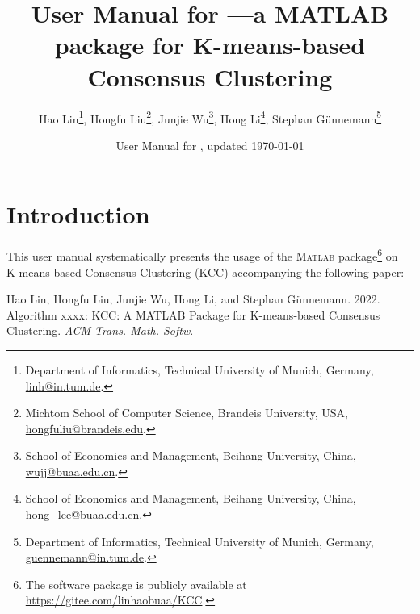 \documentclass[10pt]{acmtrans2e}
\title{User Manual for \package{KCC}---a {MATLAB} package for K-means-based Consensus Clustering}
\author{
Hao Lin\footnote{Department of Informatics, Technical University of Munich, Germany,
\textsf{\href{mailto:linh@in.tum.de}{linh@in.tum.de}}.}, \quad
Hongfu Liu\footnote{Michtom School of Computer Science, Brandeis University, USA, \textsf{\href{mailto:hongfuliu@brandeis.edu}{hongfuliu@brandeis.edu}}.}, \quad
Junjie Wu\footnote{School of Economics and Management, Beihang University, China, \textsf{\href{mailto:wujj@buaa.edu.cn}{wujj@buaa.edu.cn}}.}, \quad
Hong Li\footnote{School of Economics and Management, Beihang University, China, \textsf{\href{mailto:hong_lee@buaa.edu.cn}{hong\_lee@buaa.edu.cn}}.}, \quad
Stephan Günnemann\footnote{Department of Informatics, Technical University of Munich, Germany, \textsf{\href{mailto:guennemann@in.tum.de}{guennemann@in.tum.de}}.}
}
\date{User Manual for \package{KCC}, updated \today}
\newcommand{\Matlab}{\textsc{Matlab}}
\begin{document}
\maketitle

\vspace*{-0.5cm}

\section{Introduction}

This user manual systematically presents the usage of the \Matlab{} package\footnote{The software package is publicly available at \url{https://gitee.com/linhaobuaa/KCC}.} on K-means-based Consensus Clustering (KCC) accompanying the following paper:
\begin{center}
\begin{minipage}{0.90\textwidth}
Hao Lin, Hongfu Liu, Junjie Wu, Hong Li, and Stephan Günnemann. 2022. Algorithm xxxx: KCC: A MATLAB Package for K-means-based Consensus Clustering. \emph{ACM Trans. Math. Softw}.
\end{minipage}
\end{center}
\end{document}
